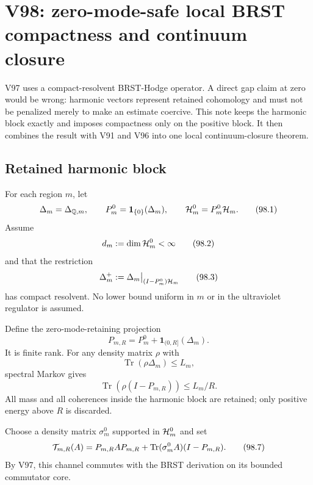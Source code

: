\documentclass[11pt]{article}
\theoremstyle{remark}
\begin{document}


\section{V98: zero-mode-safe local BRST compactness and continuum
closure}
\label{sec:v12v98}

V97 uses a compact-resolvent BRST-Hodge operator.  A direct gap
claim at zero would be wrong: harmonic vectors represent retained
cohomology and must not be penalized merely to make an estimate
coercive.  This note keeps the harmonic block exactly and imposes
compactness only on the positive block.  It then combines the
result with V91 and V96 into one local continuum-closure theorem.

\subsection{Retained harmonic block}

For each region \(m\), let
\[
 \Delta_m=\Delta_{{\mathbb Q},m},\qquad
 P_m^0=\mathbf1_{\{0\}}(\Delta_m),\qquad
 {\cal H}_m^0=P_m^0{\cal H}_m.                                  \tag{98.1}
\]
Assume
\[
 d_m:=\dim{\cal H}_m^0<\infty                                   \tag{98.2}
\]
and that the restriction
\[
 \Delta_m^+:=\Delta_m\big|_{(I-P_m^0){\cal H}_m}                 \tag{98.3}
\]
has compact resolvent.  No lower bound uniform in \(m\) or in the
ultraviolet regulator is assumed.

Define the zero-mode-retaining projection
\[
 P_{m,R}
 =
 P_m^0+\mathbf1_{(0,R]}(\Delta_m).                              \tag{98.4}
\]
It is finite rank.  For any density matrix \(\rho\) with
\[
 \operatorname{Tr}(\rho\Delta_m)\leq L_m,                        \tag{98.5}
\]
spectral Markov gives
\[
 \operatorname{Tr}(\rho(I-P_{m,R}))\leq L_m/R.                  \tag{98.6}
\]
All mass and all coherences inside the harmonic block are retained;
only positive energy above \(R\) is discarded.

Choose a density matrix \(\sigma_m^0\) supported in
\({\cal H}_m^0\) and set
\[
 {\cal T}_{m,R}(A)
 =
 P_{m,R}AP_{m,R}
 +\operatorname{Tr}(\sigma_m^0A)(I-P_{m,R}).                    \tag{98.7}
\]
By V97, this channel commutes with the BRST derivation on its bounded
commutator core.
\end{document}
